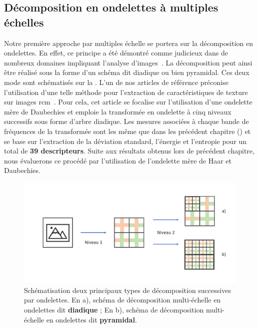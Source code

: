 \subsection{Décomposition en ondelettes à multiples échelles}
Notre première approche par multiples échelle se portera sur la décomposition en ondelettes. En effet, ce principe a été démontré comme judicieux dans de nombreux domaines impliquant l'analyse d'images~\cite{Carvalho2004}. La décomposition peut ainsi être réalisé sous la forme d'un schéma dit diadique ou bien pyramidal. Ces deux mode sont schématisés sur la . L'un de nos articles de référence préconise l'utilisation d'une telle méthode pour l'extraction de caractéristiques de texture sur images \gls{rcm}~\cite{Wiltgen2008}. Pour cela, cet article se focalise sur l'utilisation d'une ondelette mère de Daubechies et emploie la transformée en ondelette à cinq niveaux successifs sous forme d'arbre diadique. Les mesures associées à chaque bande de fréquences de la transformée sont les même que dans les précédent chapitre () et se base sur l'extraction de la déviation standard, l'énergie et l'entropie pour un total de \textbf{39 descripteurs}. Suite aux résultats obtenus lors de précédent chapitre, nous évaluerons ce procédé par l'utilisation de l'ondelette mère de Haar et Daubechies.\par

\begin{figure}[H]
    \centering
    \includegraphics[width=\textwidth]{contents/chapter_5/resources/scheme_dwt_decomposition.pdf}
    \caption{Schématisation deux principaux types de décomposition successives par ondelettes. En a), schéma de décomposition multi-échelle en ondelettes dit \textbf{diadique} ; En b), schéma de décomposition multi-échelle en ondelettes dit \textbf{pyramidal}.}
    \label{fig:scheme_dwt_decomposition}
\end{figure}\par

